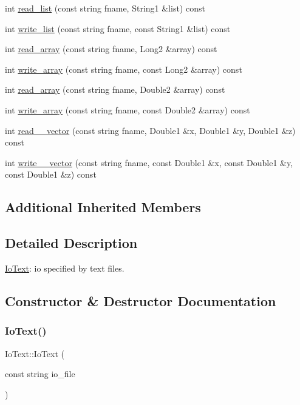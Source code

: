 \begin{DoxyCompactItemize}
int \mbox{\hyperlink{structIoText_a2aa750808cede99dd912cb93ca522995}{read\+\_\+list}} (const string fname, String1 \&list) const
\item 
int \mbox{\hyperlink{structIoText_a00ff0f739766d736557f44aa4ac0f34f}{write\+\_\+list}} (const string fname, const String1 \&list) const
\item 
int \mbox{\hyperlink{structIoText_a578827ab1f2e3c02dcd35d7d554f04b3}{read\+\_\+array}} (const string fname, Long2 \&array) const
\item 
int \mbox{\hyperlink{structIoText_a92319cdc25084941070cfc9d4fbd2feb}{write\+\_\+array}} (const string fname, const Long2 \&array) const
\item 
int \mbox{\hyperlink{structIoText_a732c8d4dfdeb8c1a8f139427ce4cef20}{read\+\_\+array}} (const string fname, Double2 \&array) const
\item 
int \mbox{\hyperlink{structIoText_a6382d40981a90b3fb3fe8e33bbc3f50e}{write\+\_\+array}} (const string fname, const Double2 \&array) const
\item 
int \mbox{\hyperlink{structIoText_a6984cd43f514a75a120cb63ee1b270dc}{read\+\_\+\_\+vector}} (const string fname, Double1 \&x, Double1 \&y, Double1 \&z) const
\item 
int \mbox{\hyperlink{structIoText_a82af8045d5527d879c12dee52c9c2071}{write\+\_\+\_\+vector}} (const string fname, const Double1 \&x, const Double1 \&y, const Double1 \&z) const
\end{DoxyCompactItemize}
\subsection*{Additional Inherited Members}


\subsection{Detailed Description}
\mbox{\hyperlink{structIoText}{Io\+Text}}\+: io specified by text files. 

\subsection{Constructor \& Destructor Documentation}
\mbox{\label{structIoText_acbd0c221f311371d83bfa7588ca33ae7}} 
\subsubsection{\texorpdfstring{Io\+Text()}{IoText()}}
{\footnotesize\ttfamily Io\+Text\+::\+Io\+Text (\begin{DoxyParamCaption}\item[{const string}]{io\+\_\+file }\end{DoxyParamCaption})}

